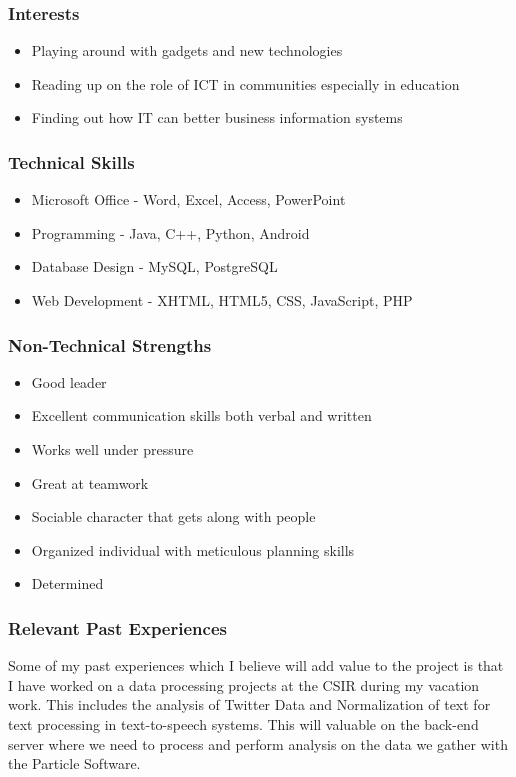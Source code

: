 \documentclass[a4paper,12pt]{article}
\begin{document}
\subsubsection{Interests}
\begin{itemize}
\item Playing around with gadgets and new technologies
\item Reading up on the role of ICT in communities especially in education
\item Finding out how IT can better business information systems
\end{itemize}
\subsubsection{Technical Skills}
\begin{itemize}
\item Microsoft Office - Word, Excel, Access, PowerPoint
\item Programming - Java, C++, Python, Android
\item Database Design - MySQL, PostgreSQL
\item Web Development - XHTML, HTML5, CSS, JavaScript, PHP
\end{itemize}
\subsubsection{Non-Technical Strengths}
\begin{itemize}
\item Good leader
\item Excellent communication skills both verbal and written
\item Works well under pressure
\item Great at teamwork
\item Sociable character that gets along with people
\item Organized individual with meticulous planning skills
\item Determined
\end{itemize}
\subsubsection{Relevant Past Experiences}
Some of my past experiences which I  believe will add value to the project is that I have worked on a data processing projects at the CSIR during my vacation work. This includes the analysis of Twitter Data and Normalization of text for text processing in text-to-speech systems. This will valuable on the back-end server where we need to process and perform analysis on the data we gather with the Particle Software.
\end{document}
